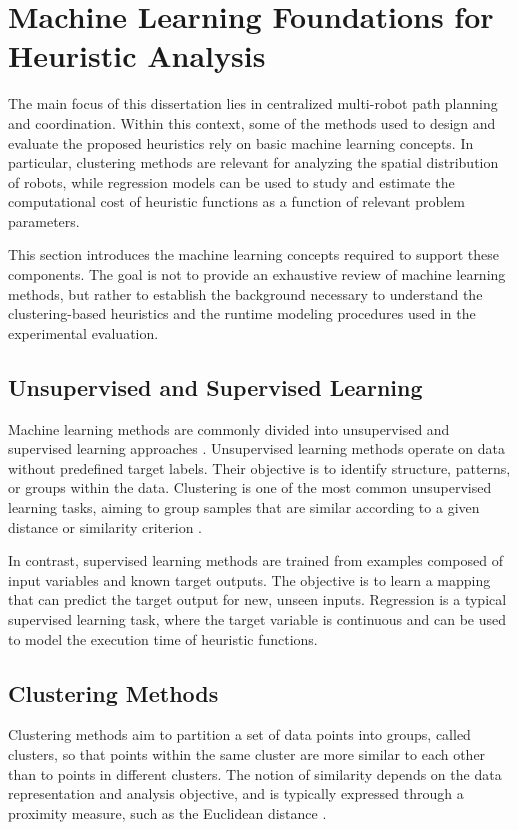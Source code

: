 \section{Machine Learning Foundations for Heuristic Analysis}
\label{sec:ml_foundations}
\hspace{\parindent}
The main focus of this dissertation lies in centralized multi-robot path planning and
coordination. Within this context, some of the methods used to design and evaluate the proposed
heuristics rely on basic machine learning concepts. In particular, clustering methods are relevant
for analyzing the spatial distribution of robots, while regression models can be used to study and
estimate the computational cost of heuristic functions as a function of relevant problem
parameters.

This section introduces the machine learning concepts required to support these components.
The goal is not to provide an exhaustive review of machine learning methods, but rather to
establish the background necessary to understand the clustering-based heuristics and the runtime
modeling procedures used in the experimental evaluation.

\subsection{Unsupervised and Supervised Learning}
\label{subsec:unsupervised_supervised_learning}
\hspace{\parindent}
Machine learning methods are commonly divided into unsupervised and supervised learning
approaches \cite{theodoridis2020machine}. Unsupervised learning methods operate on data
without predefined target labels. Their objective is to identify structure, patterns, or groups within
the data. Clustering is one of the most common unsupervised learning tasks, aiming to group
samples that are similar according to a given distance or similarity criterion
\cite{theodoridis2020machine}.

In contrast, supervised learning methods are trained from examples composed of input variables
and known target outputs. The objective is to learn a mapping that can predict the target output
for new, unseen inputs. Regression is a typical supervised learning task, where the target variable
is continuous and can be used to model the execution time of heuristic functions.

\subsection{Clustering Methods}
\label{subsec:clustering_methods}
\hspace{\parindent}
Clustering methods aim to partition a set of data points into groups, called clusters, so that
points within the same cluster are more similar to each other than to points in different clusters.
The notion of similarity depends on the data representation and analysis objective, and is typically
expressed through a proximity measure, such as the Euclidean distance
\cite{theodoridis2020machine}.

